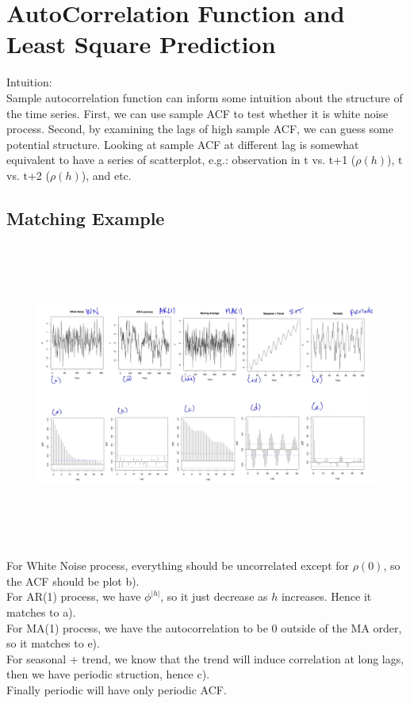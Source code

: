 \chapter{AutoCorrelation Function and Least Square Prediction}
Intuition: \\
Sample autocorrelation function can inform some intuition about the structure of the time series. First, we can use sample ACF to test whether it is white noise process. Second, by examining the lags of high sample ACF, we can guess some potential structure. Looking at sample ACF at different lag is somewhat equivalent to have a series of scatterplot, e.g.: observation in t vs. t+1 ($\rho(h)$), t vs. t+2 ($\rho(h)$), and etc.
\section{Matching Example}
    \begin{figure}[H]
    \includegraphics[width=14cm, height=10cm]{images/001_acf_match.png}
    \end{figure}
For White Noise process, everything should be uncorrelated except for $\rho(0)$, so the ACF should be plot b). \\
For AR(1) process, we have $\phi^{|h|}$, so it just decrease as $h$ increases. Hence it matches to a). \\
For MA(1) process, we have the autocorrelation to be 0 outside of the MA order, so it matches to e). \\
For seasonal + trend, we know that the trend will induce correlation at long lags, then we have periodic struction, hence c). \\
Finally periodic will have only periodic ACF. 

